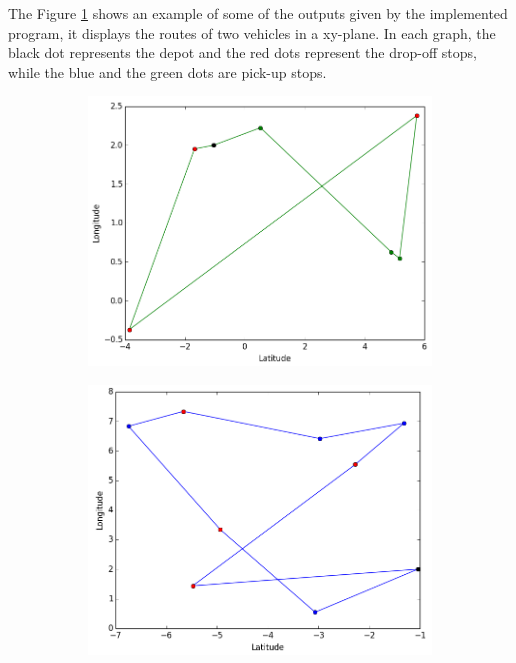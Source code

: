 \documentclass[tuberlin,cic,tc,openright,english,noabntcite,oneside]{iiufrgs}
\begin{document}
The Figure \ref{fig:output} shows an example of some of the outputs given by the implemented program, it displays the routes of two vehicles in a xy-plane. In each graph, the black dot represents the depot and the red dots represent the drop-off stops, while the blue and the green dots are pick-up stops.
\begin{figure}[H]
	\centering
    \caption{Example of output by the program}
    \begin{subfigure}[b]{0.49\textwidth}
	    \includegraphics[width=\textwidth]{fig_output1}
    \end{subfigure}
    \begin{subfigure}[b]{0.49\textwidth}
	    \includegraphics[width=\textwidth]{fig_output2}
    \end{subfigure}\par
    \label{fig:output}
\end{figure}
\end{document}
